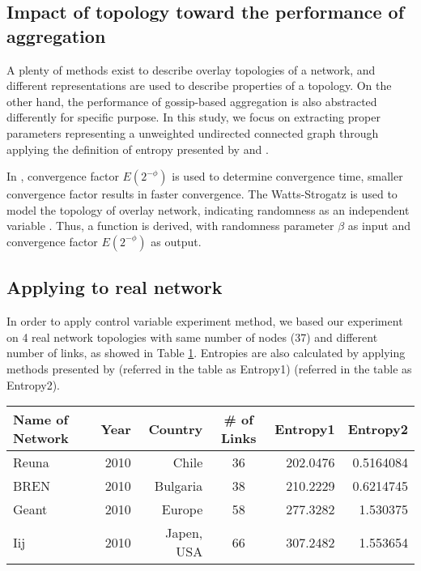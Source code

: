 \documentclass[11pt,a4paper]{article}
\begin{document}
\subsection{Impact of topology toward the performance of aggregation}
A plenty of methods exist to describe overlay topologies of a network, and different representations are used to describe properties of a topology. On the other hand, the performance of gossip-based aggregation is also abstracted differently for specific purpose.
In this study, we focus on extracting proper parameters representing a unweighted undirected connected graph through applying the definition of entropy presented by \cite{entropy1} and \cite{entropy2}.

In \cite{jelasity_gossip-based_2005}, convergence factor $E(2^{-\phi})$ is used to determine convergence time, smaller convergence factor results in faster convergence. The Watts-Strogatz is used to model the topology of overlay network, indicating randomness as an independent variable \cite{Watts1998}. Thus, a function is derived, with randomness parameter $\beta$ as input and convergence factor $E(2^{-\phi})$ as output.

\subsection{Applying to real network}
In order to apply control variable experiment method, we based our experiment on 4 real network topologies with same number of nodes (37) and different number of links, as showed in Table \ref{table: network}. Entropies are also calculated by applying methods presented by \cite{entropy1} (referred in the table as Entropy1) \cite{entropy2} (referred in the table as Entropy2).
\begin{table}
\centering
\begin{tabular}{lrrcrr}
	\hline
	Name of Network & Year & Country & \# of Links & Entropy1 & Entropy2\\
    \hline
    Reuna & 2010 & Chile & 36 & 202.0476 & 0.5164084\\
    BREN & 2010 & Bulgaria & 38 & 210.2229 & 0.6214745\\
    Geant & 2010 & Europe & 58 & 277.3282 & 1.530375\\
    Iij & 2010 & Japen, USA & 66 & 307.2482 & 1.553654\\
    \hline
\end{tabular}
\label{table: network}
\end{table}

\end{document}
